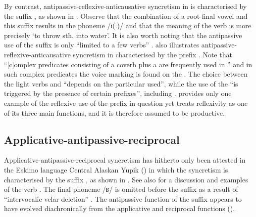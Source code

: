 By contrast, antipassive-reflexive-anticausative syncretism in  is characterised by the suffix , as shown in . Observe that the combination of a root-final vowel and this suffix results in the phoneme /i(ː)/ \citep[98ff.]{heath:1984} and that the meaning of the verb  is more precisely ‘to throw sth. into water’. It is also worth noting that the antipassive use of the suffix  is only “limited to a few verbs” \citep[390]{heath:1984}.  also illustrates anti\-pas\-sive-re\-flex\-ive-anti\-cau\-sative syncretism in  characterised by the prefix . Note that “[c]omplex predicates consisting of a coverb plus a  are frequently used in ” \citep[310]{loughnane:2009} and in such complex predicates the voice marking is found on the . The choice between the light verbs  and  “depends on the particular  used”, while the use of the   “is triggered by the presence of certain prefixes”, including  \citep[323]{loughnane:2009}. \cite[238ff.]{loughnane:2009} provides only one example of the reflexive use of the prefix in question yet treats reflexivity as one of its three main functions, and it is therefore assumed to be productive.

\subsection{Applicative-antipassive-reciprocal} \label{sec:complex-syncretism:appl-antp-recp}
Applicative-antipassive-reciprocal syncretism has hitherto only been attested in the Eskimo language Central Alaskan Yupik () in which the syncretism is characterised by the suffix , as shown in . See also \cite[96ff.]{mithun:2000} for a discussion and examples of the verb . The final phoneme  /ʁ/ is omitted before the suffix  as a result of “intervocalic velar deletion” \citep[211f.]{miyaoka:2012}. The antipassive function of the suffix  appears to have evolved diachronically from the applicative and reciprocal functions (). 

